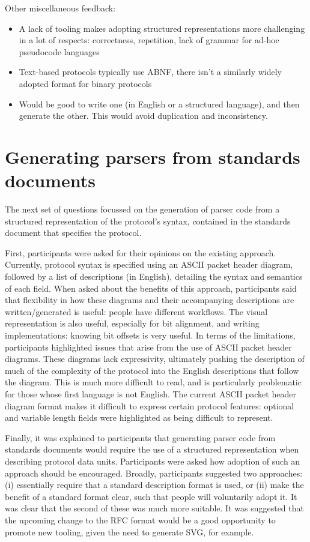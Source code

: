 \documentclass[10pt]{article}
\begin{document}
Other miscellaneous feedback:
\begin{itemize}
	\item A lack of tooling makes adopting structured representations more challenging in
	      a lot of respects: correctness, repetition, lack of grammar for ad-hoc
	      pseudocode languages
	\item Text-based protocols typically use ABNF, there isn't a similarly widely adopted
	      format for binary protocols
	\item Would be good to write one (in English or a structured language), and then
	      generate the other. This would avoid duplication and inconsistency.
\end{itemize}

\section{Generating parsers from standards documents}

The next set of questions focussed on the generation of parser code from a structured
representation of the protocol's syntax, contained in the standards document that
specifies the protocol.

First, participants were asked for their opinions on the existing approach. Currently,
protocol syntax is specified using an ASCII packet header diagram, followed by a list of
descriptions (in English), detailing the syntax and semantics of each field. When asked
about the benefits of this approach, participants said that flexibility in how these
diagrams and their accompanying descriptions are written/generated is useful: people have
different workflows. The visual representation is also useful, especially for bit
alignment, and writing implementations: knowing bit offsets is very useful. In terms of
the limitations, participants highlighted issues that arise from the use of ASCII packet
header diagrams. These diagrams lack expressivity, ultimately pushing the description of
much of the complexity of the protocol into the English descriptions that follow the
diagram. This is much more difficult to read, and is particularly problematic for those
whose first language is not English. The current ASCII packet header diagram format makes
it difficult to express certain protocol features: optional and variable length fields
were highlighted as being difficult to represent.

Finally, it was explained to participants that generating parser code from standards
documents would require the use of a structured representation when describing protocol
data units. Participants were asked how adoption of such an approach should be encouraged.
Broadly, participants suggested two approaches: (i) essentially require that a standard
description format is used, or (ii) make the benefit of a standard format clear, such that
people will voluntarily adopt it. It was clear that the second of these was much more
suitable. It was suggested that the upcoming change to the RFC format would be a good
opportunity to promote new tooling, given the need to generate SVG, for example. 
\end{document}
